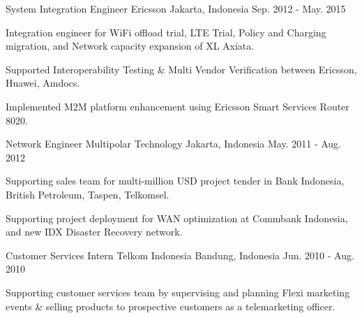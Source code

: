 \begin{cventries}
  \cventry
    {System Integration Engineer} %
    {Ericsson} %
    {Jakarta, Indonesia} %
    {Sep. 2012 - May. 2015} %
    {
      \begin{cvitems} %
        \item {Integration engineer for WiFi offload trial, LTE Trial, Policy and Charging migration, and Network capacity expansion of XL Axiata.}
        \item {Supported Interoperability Testing \& Multi Vendor Verification between Ericsson, Huawei, Amdocs.}
        \item {Implemented M2M platform enhancement using Ericsson Smart Services Router 8020.}
      \end{cvitems}
    }

  \cventry
    {Network Engineer} %
    {Multipolar Technology} %
    {Jakarta, Indonesia} %
    {May. 2011 - Aug. 2012} %
    {
      \begin{cvitems} %
        \item {Supporting sales team for multi-million USD project tender in Bank Indonesia, British Petroleum, Taspen, Telkomsel.}
        \item {Supporting project deployment for WAN optimization at Commbank Indonesia, and new IDX Disaster Recovery network.}
      \end{cvitems}
    }

  \cventry
    {Customer Services Intern} %
    {Telkom Indonesia} %
    {Bandung, Indonesia} %
    {Jun. 2010 - Aug. 2010} %
    {
      \begin{cvitems} %
        \item {Supporting customer services team by supervising and planning Flexi marketing events \& selling products to prospective customers as a telemarketing officer.}
      \end{cvitems}
    }

\end{cventries}
